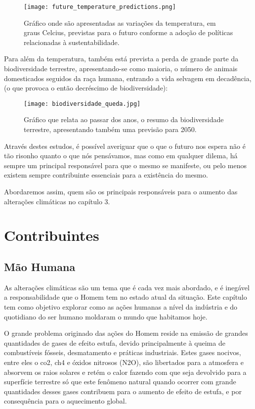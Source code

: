 \documentclass{report}
\begin{document}
\begin{figure}[H]
	\centering
	\texttt{[image: future\_temperature\_predictions.png]}
	\caption{Gráfico onde são apresentadas as variações da temperatura, em graus Celcius, previstas para o futuro conforme a adoção de políticas relacionadas à sustentabilidade.}
	\label{fig:previsoes_climaticas}
\end{figure}

Para além da temperatura, também está prevista a perda de grande parte da biodiversidade terrestre, apresentando-se como maioria, o número de animais domesticados seguidos da raça humana, entrando a vida selvagem em decadência, (o que provoca o então decréscimo de biodiversidade):

\begin{figure}[H]
	\centering
	\texttt{[image: biodiversidade\_queda.jpg]}
	\caption{Gráfico que relata ao passar dos anos, o resumo da biodiversidade terrestre, apresentando também uma previsão para 2050.}
	\label{fig:biodiversidade_em_queda}
\end{figure}

Através destes estudos, é possível averiguar que o que o futuro nos espera não é tão risonho quanto o que nós pensávamos, mas como em qualquer dilema, há sempre um principal responsável para que o mesmo se manifeste, ou pelo menos existem sempre contribuinte essenciais para a existência do mesmo.

Abordaremos assim, quem são os principais responsáveis para o aumento das alterações climáticas no capítulo 3.

\chapter{Contribuintes}
\label{chap.resultados}

\section{Mão Humana}
As alterações climáticas são um tema que é cada vez mais abordado, e é inegável a responsabilidade que o Homem tem no estado atual da situação. Este capítulo tem como objetivo explorar como as ações humanas a nível da indústria e do quotidiano do ser humano moldaram o mundo que habitamos hoje.

O grande problema originado das ações do Homem reside na emissão de grandes quantidades de gases de efeito estufa, devido principalmente à queima de combustíveis fósseis, desmatamento e práticas industriais. Estes gases nocivos, entre eles o \ac{co2}, \ac{ch4} e óxidos nitrosos (N2O), são libertados para a atmosfera e absorvem os raios solares e retém o calor fazendo com que seja devolvido para a superfície terrestre só que este fenômeno natural quando ocorrer com grande quantidades desses gases contribuem para o aumento de efeito de estufa, e por consequência para o aquecimento global.
\end{document}
